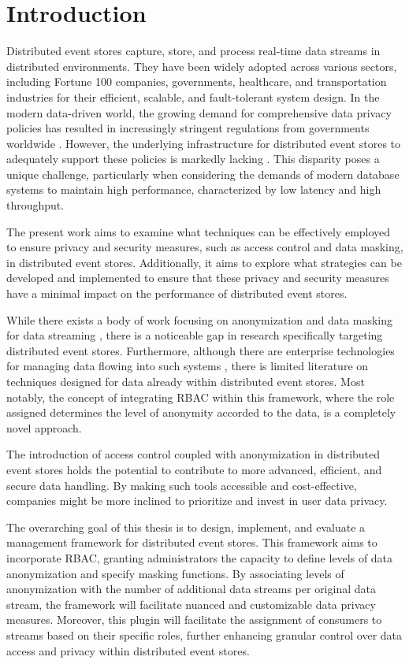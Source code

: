\chapter{Introduction\label{cha:chapter1}}
Distributed event stores capture, store, and process real-time data streams in distributed environments. They have been widely adopted across various sectors, including Fortune 100 companies, governments, healthcare, and transportation industries \cite{kafka} for their efficient, scalable, and fault-tolerant system design. In the modern data-driven world, the growing demand for comprehensive data privacy policies has resulted in increasingly stringent regulations from governments worldwide \cite{GDPR, CCPA}. However, the underlying infrastructure for distributed event stores to adequately support these policies is markedly lacking \cite{Colombo2015}. This disparity poses a unique challenge, particularly when considering the demands of modern database systems to maintain high performance, characterized by low latency and high throughput.\par
The present work aims to examine what techniques can be effectively employed to ensure privacy and security measures, such as access control and data masking, in distributed event stores. Additionally, it aims to explore what strategies can be developed and implemented to ensure that these privacy and security measures have a minimal impact on the performance of distributed event stores. \par
While there exists a body of work focusing on anonymization and data masking for data streaming \cite{Cao2008, KIDS_zhang, anonymizing_IoT}, there is a noticeable gap in research specifically targeting distributed event stores. 
Furthermore, although there are enterprise technologies for managing data flowing into such systems \cite{privitar}, there is limited literature on techniques designed for data already within distributed event stores. Most notably, the concept of integrating \ac{RBAC} within this framework, where the role assigned determines the level of anonymity accorded to the data, is a completely novel approach. \par
The introduction of access control coupled with anonymization in distributed event stores holds the potential to contribute to more advanced, efficient, and secure data handling. By making such tools accessible and cost-effective, companies might be more inclined to prioritize and invest in user data privacy.\par
The overarching goal of this thesis is to design, implement, and evaluate a management framework for distributed event stores. This framework aims to incorporate \ac{RBAC}, granting administrators the capacity to define levels of data anonymization and specify masking functions. By associating levels of anonymization with the number of additional data streams per original data stream, the framework will facilitate nuanced and customizable data privacy measures. Moreover, this plugin will facilitate the assignment of consumers to streams based on their specific roles, further enhancing granular control over data access and privacy within distributed event stores.\par
